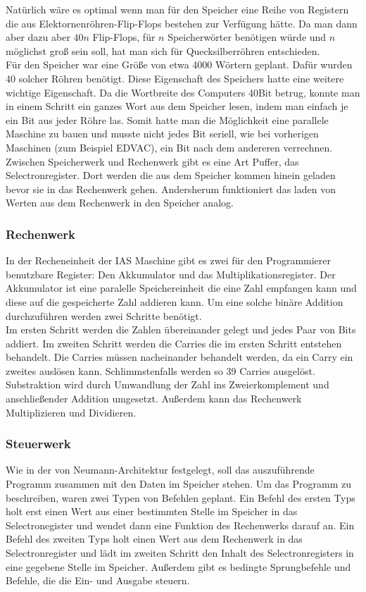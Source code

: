 \documentclass[12pt]{report}
\begin{document}
Natürlich wäre es optimal wenn man für den Speicher eine Reihe von Registern die aus Elektornenröhren-Flip-Flops bestehen zur Verfügung hätte. Da man dann aber dazu aber $40n$ Flip-Flops, für $n$ Speicherwörter benötigen würde und $n$ möglichst groß sein soll, hat man sich für Quecksilberröhren entschieden.\\
Für den Speicher war eine Größe von etwa 4000 Wörtern geplant. Dafür wurden 40 solcher Röhren benötigt. Diese Eigenschaft des Speichers hatte eine weitere wichtige Eigenschaft. Da die Wortbreite des Computers 40Bit betrug, konnte man in einem Schritt ein ganzes Wort aus dem Speicher lesen, indem man einfach je ein Bit aus jeder Röhre las. Somit hatte man die Möglichkeit eine parallele Maschine zu bauen und musste nicht jedes Bit seriell, wie bei vorherigen Maschinen (zum Beispiel EDVAC), ein Bit nach dem andereren verrechnen.\\
Zwischen Speicherwerk und Rechenwerk gibt es eine Art Puffer, das Selectronregister. Dort werden die aus dem Speicher kommen hinein geladen bevor sie in das Rechenwerk gehen. Andersherum funktioniert das laden von Werten aus dem Rechenwerk in den Speicher analog.

\subsubsection{Rechenwerk}

In der Recheneinheit der IAS Maschine gibt es zwei für den Programmierer benutzbare Register: Den Akkumulator und das Multiplikationsregister.
Der Akkumulator ist eine paralelle Speichereinheit die eine Zahl empfangen kann und diese auf die gespeicherte Zahl addieren kann. Um eine solche
binäre Addition durchzuführen werden zwei Schritte benötigt.\\
Im ersten Schritt werden die Zahlen übereinander gelegt und jedes Paar von Bits addiert. Im zweiten Schritt werden die Carries die im ersten Schritt entstehen behandelt.
Die Carries müssen nacheinander behandelt werden, da ein Carry ein zweites auslösen kann. Schlimmstenfalls werden so 39 Carries ausgelöst.
Substraktion wird durch Umwandlung der Zahl ins Zweierkomplement und anschließender Addition umgesetzt.
Außerdem kann das Rechenwerk Multiplizieren und Dividieren.

\subsubsection{Steuerwerk}

Wie in der von Neumann-Architektur festgelegt, soll das auszuführende Programm zusammen mit den Daten im Speicher stehen. Um das Programm zu beschreiben, waren zwei Typen von Befehlen geplant. Ein Befehl des ersten Typs holt erst einen Wert aus einer bestimmten Stelle im Speicher in das Selectronegister und wendet dann eine Funktion des Rechenwerks darauf an. Ein Befehl des zweiten Typs holt einen Wert aus dem Rechenwerk in das Selectronregister und lädt im zweiten Schritt den Inhalt des Selectronregisters in eine gegebene Stelle im Speicher. Außerdem gibt es bedingte Sprungbefehle und Befehle, die die Ein- und Ausgabe steuern.
\end{document}
